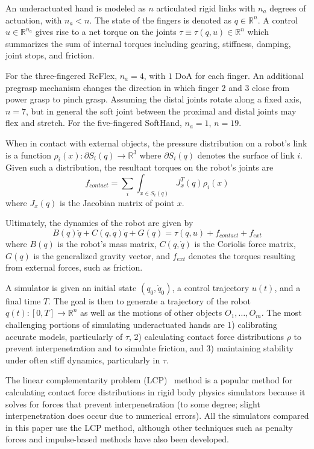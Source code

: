 An underactuated hand is modeled as  $n$ articulated rigid links with $n_a$ degrees of actuation, with $n_a < n$.  The state of the fingers is denoted as $q \in \mathbb{R}^n$.  A control $u \in \mathbb{R}^{n_a}$ gives rise to a net torque on the joints $\tau \equiv \tau(q,u) \in \mathbb{R}^n$ which summarizes the sum of internal torques including gearing, stiffness, damping, joint stops, and friction.

For the three-fingered ReFlex, $n_a=4$, with $1$ DoA for each finger. An additional pregrasp mechanism changes the direction in which finger $2$ and $3$ close from power grasp to pinch grasp. Assuming the distal joints rotate along a fixed axis, $n=7$, but in general the soft joint between the proximal and distal joints may flex and stretch.
For the five-fingered SoftHand, $n_a=1$, $n=19$.

When in contact with external objects, the pressure distribution on a robot's link is a function $\rho_i(x):\partial S_i(q) \rightarrow \mathbb{R}^3$ where $\partial S_i(q)$ denotes the surface of link $i$. Given such a distribution, the resultant torques on the robot's joints are 
\begin{equation}
f_{contact} = \sum_i \int_{x\in S_i(q)} J_{x}^T(q) \rho_i(x)
\end{equation} where $J_{x}(q)$ is the Jacobian matrix of point $x$.

Ultimately, the dynamics of the robot are given by
\begin{equation}
\label{eq:Dynamics}
B(q)\ddot{q} + C(q,\dot{q})\dot{q} + G(q) = \tau(q,u) + f_{contact} + f_{ext}
\end{equation}
where $B(q)$ is the robot's mass matrix, $C(q,\dot{q})$ is the Coriolis force matrix, $G(q)$ is the generalized gravity vector, and $f_{ext}$ denotes the torques resulting from external forces, such as friction.

A simulator is given an initial state $(q_0,\dot{q}_0)$, a control trajectory $u(t)$, and a final time $T$.  The goal is then to generate a trajectory of the robot $q(t):[0,T]\rightarrow \mathbb{R}^n$ as well as the motions of other objects $O_1,\ldots,O_m$. The most challenging portions of simulating underactuated hands are 1) calibrating accurate models, particularly of $\tau$, 2) calculating contact force distributions $\rho$ to prevent interpenetration and to simulate friction, and 3) maintaining stability under often stiff dynamics, particularly in $\tau$.

The linear complementarity problem (LCP)~\cite{Anitescu97} method is a popular method for calculating contact force distributions in rigid body physics simulators because it solves for forces that prevent interpenetration (to some degree; slight interpenetration does occur due to numerical errors).  All the simulators compared in this paper use the LCP method, although other techniques such as penalty forces and impulse-based methods have also been developed.


